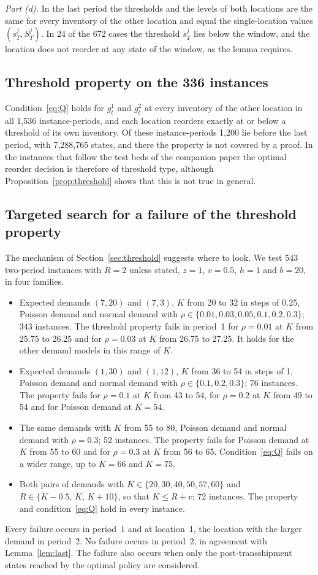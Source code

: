 \documentclass[11pt]{article}
\theoremstyle{definition}
\begin{document}
\emph{Part (d).} In the last period the thresholds and the levels of both locations are the same for every inventory of the other location and equal the single-location values $(s^j_T,S^j_T)$. In 24 of the 672 cases the threshold $s^j_T$ lies below the window, and the location does not reorder at any state of the window, as the lemma requires.

\subsection{Threshold property on the 336 instances}

Condition~\eqref{eq:Q} holds for $g^1_t$ and $g^2_t$ at every inventory of the other location in all 1,536 instance-periods, and each location reorders exactly at or below a threshold of its own inventory. Of these instance-periods 1,200 lie before the last period, with 7,288,765 states, and there the property is not covered by a proof. In the instances that follow the test beds of the companion paper the optimal reorder decision is therefore of threshold type, although Proposition~\ref{prop:threshold} shows that this is not true in general.

\subsection{Targeted search for a failure of the threshold property}

The mechanism of Section~\ref{sec:threshold} suggests where to look. We test 543 two-period instances with $R=2$ unless stated, $z=1$, $v=0.5$, $h=1$ and $b=20$, in four families.
\begin{itemize}
\item Expected demands $(7,20)$ and $(7,3)$, $K$ from 20 to 32 in steps of 0.25, Poisson demand and normal demand with $\rho\in\{0.01,0.03,0.05,0.1,0.2,0.3\}$; 343 instances. The threshold property fails in period~1 for $\rho=0.01$ at $K$ from 25.75 to 26.25 and for $\rho=0.03$ at $K$ from 26.75 to 27.25. It holds for the other demand models in this range of $K$.
\item Expected demands $(1,30)$ and $(1,12)$, $K$ from 36 to 54 in steps of 1, Poisson demand and normal demand with $\rho\in\{0.1,0.2,0.3\}$; 76 instances. The property fails for $\rho=0.1$ at $K$ from 43 to 54, for $\rho=0.2$ at $K$ from 49 to 54 and for Poisson demand at $K=54$.
\item The same demands with $K$ from 55 to 80, Poisson demand and normal demand with $\rho=0.3$; 52 instances. The property fails for Poisson demand at $K$ from 55 to 60 and for $\rho=0.3$ at $K$ from 56 to 65. Condition~\eqref{eq:Q} fails on a wider range, up to $K=66$ and $K=75$.
\item Both pairs of demands with $K\in\{20,30,40,50,57,60\}$ and $R\in\{K-0.5,\,K,\,K+10\}$, so that $K\le R+v$; 72 instances. The property and condition~\eqref{eq:Q} hold in every instance.
\end{itemize}
Every failure occurs in period~1 and at location~1, the location with the larger demand in period~2. No failure occurs in period~2, in agreement with Lemma~\ref{lem:last}. The failure also occurs when only the post-transshipment states reached by the optimal policy are considered.
\end{document}

